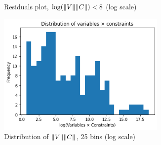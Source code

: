 \begin{figure}
\begin{subfigure}{0.475\textwidth}
\caption{Residuals plot, $\log(\lVert V\rVert\lVert C\rVert) < 8$ (log scale)}
\label{fig:stats:residuals-zoom}
\end{subfigure}
\hfill
\begin{subfigure}{0.475\textwidth}
\includegraphics[width=0.9\textwidth]{images/distribution.png}
\caption{Distribution of $\lVert V\rVert\lVert C\rVert$, 25 bins (log scale)}
\label{fig:stats:vcs-distr}
\end{subfigure}
\caption{}
\label{fig:stats}
\end{figure}
